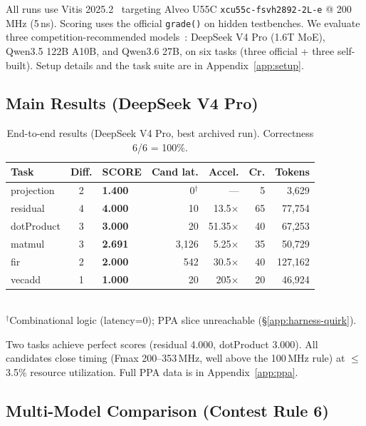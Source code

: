 \documentclass[10pt,conference,letterpaper]{IEEEtran}
\begin{document}
All runs use Vitis 2025.2~\cite{ug1399} targeting Alveo U55C \texttt{xcu55c-fsvh2892-2L-e} @ 200\,MHz (5\,ns). Scoring uses the official \texttt{grade()} on hidden testbenches. We evaluate three competition-recommended models~\cite{fpt26rules,deepseek,qwen}: DeepSeek V4 Pro (1.6T MoE), Qwen3.5 122B A10B, and Qwen3.6 27B, on six tasks (three official + three self-built). Setup details and the task suite are in Appendix~\ref{app:setup}.

\subsection{Main Results (DeepSeek V4 Pro)}

\begin{table}[h]
\centering
\caption{End-to-end results (DeepSeek V4 Pro, best archived run). Correctness 6/6 = 100\%.}
\label{tab:results}
\footnotesize
\begin{tabular}{lclrrrr}
\toprule
\textbf{Task} & \textbf{Diff.} & \textbf{SCORE} & \textbf{Cand lat.} & \textbf{Accel.} & \textbf{Cr.} & \textbf{Tokens} \\
\midrule
projection & 2 & \textbf{1.400} & 0$^\dagger$ & --- & 5 & 3,629 \\
residual & 4 & \textbf{4.000} & 10 & 13.5$\times$ & 65 & 77,754 \\
dotProduct & 3 & \textbf{3.000} & 20 & 51.35$\times$ & 40 & 67,253 \\
matmul & 3 & \textbf{2.691} & 3,126 & 5.25$\times$ & 35 & 50,729 \\
fir & 2 & \textbf{2.000} & 542 & 30.5$\times$ & 40 & 127,162 \\
vecadd & 1 & \textbf{1.000} & 20 & 205$\times$ & 20 & 46,924 \\
\bottomrule
\end{tabular}
\\[2pt]
\scriptsize $^\dagger$Combinational logic (latency=0); PPA slice unreachable (\S\ref{app:harness-quirk}).
\end{table}

Two tasks achieve perfect scores (residual 4.000, dotProduct 3.000). All candidates close timing (Fmax 200--353\,MHz, well above the 100\,MHz rule) at $\leq$3.5\% resource utilization. Full PPA data is in Appendix~\ref{app:ppa}.

\subsection{Multi-Model Comparison (Contest Rule 6)}
\label{sec:multimodel}
\end{document}
